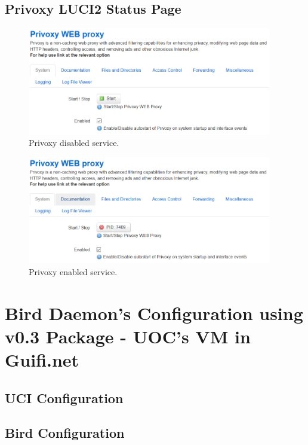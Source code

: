 \begin{appendices}
\section{Privoxy LUCI2 Status Page}
\begin{figure}[H]
    \centering
    \includegraphics[width=0.95\textwidth]{images/luciextra/disabled}
    \caption{Privoxy disabled service.}
    \label{fig:privdis}
\end{figure}

\begin{figure}[H]
    \centering
    \includegraphics[width=0.95\textwidth]{images/luciextra/enabled}
    \caption{Privoxy enabled service.}
    \label{fig:priven}
\end{figure}

\chapter{Bird Daemon's Configuration using v0.3 Package - UOC's VM in Guifi.net}
\label{app:ch:bdcuoc}

\section{UCI Configuration}


\section{Bird Configuration}



\end{appendices}
